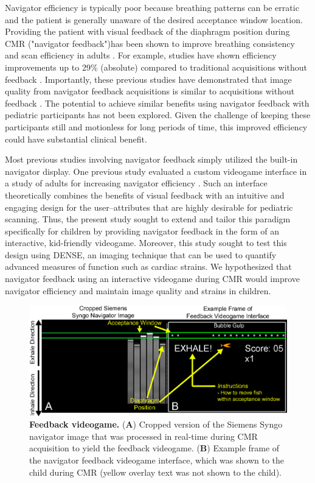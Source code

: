 	Navigator efficiency is typically poor because breathing patterns can be erratic \cite{Liu1993,Wang1995a,Taylor1997a} and the patient is generally unaware of the desired acceptance window location. Providing the patient with visual feedback of the diaphragm position during CMR ("navigator feedback")has been shown to improve breathing consistency and scan efficiency in adults \cite{Feuerlein2009,Liu1993}. For example, studies have shown efficiency improvements up to 29\% (absolute) compared to traditional acquisitions without feedback \cite{Feuerlein2009,Jhooti2011}. Importantly, these previous studies have demonstrated that image quality from navigator feedback acquisitions is similar to acquisitions without feedback \cite{Feuerlein2009,Jhooti2011}. The potential to achieve similar benefits using navigator feedback with pediatric participants has not been explored. Given the challenge of keeping these participants still and motionless for long periods of time, this improved efficiency could have substantial clinical benefit.
	
	Most previous studies involving navigator feedback simply utilized the built-in navigator display. One previous study evaluated a custom videogame interface in a study of adults for increasing navigator efficiency \cite{Jhooti2011}. Such an interface theoretically combines the benefits of visual feedback with an intuitive and engaging design for the user--attributes that are highly desirable for pediatric scanning. Thus, the present study sought to extend and tailor this paradigm specifically for children by providing navigator feedback in the form of an interactive, kid-friendly videogame. Moreover, this study sought to test this design using DENSE, an imaging technique that can be used to quantify advanced measures of function such as cardiac strains. We hypothesized that navigator feedback using an interactive videogame during CMR would improve navigator efficiency and maintain image quality and strains in children.

\begin{figure} 
	\includegraphics{figures/gamepaper/01-FeedbackGame}
	\caption[Feedback videogame]{\textbf{Feedback videogame.} (\textbf{A}) Cropped version of the Siemens Syngo navigator image that was processed in real-time during CMR acquisition to yield the feedback videogame. (\textbf{B}) Example frame of the navigator feedback videogame interface, which was shown to the child during CMR (yellow overlay text was not shown to the child).}
	\label{fig:feedbackgame}
\end{figure}

